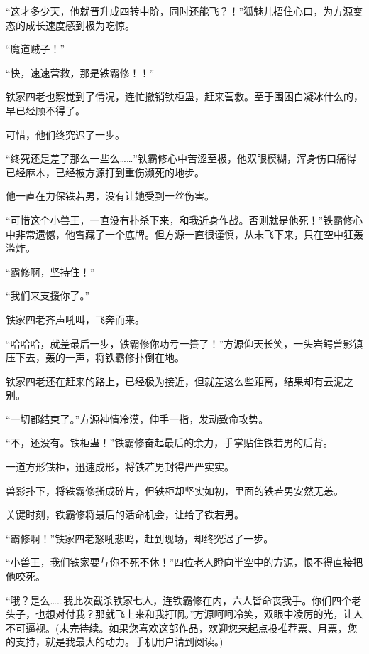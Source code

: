 \begin{this_body}
“这才多少天，他就晋升成四转中阶，同时还能飞？！”狐魅儿捂住心口，为方源变态的成长速度感到极为吃惊。

“魔道贼子！”

“快，速速营救，那是铁霸修！！”

铁家四老也察觉到了情况，连忙撤销铁柜蛊，赶来营救。至于围困白凝冰什么的，早已经顾不得了。

可惜，他们终究迟了一步。

“终究还是差了那么一些么……”铁霸修心中苦涩至极，他双眼模糊，浑身伤口痛得已经麻木，已经被方源打到重伤濒死的地步。

他一直在力保铁若男，没有让她受到一丝伤害。

“可惜这个小兽王，一直没有扑杀下来，和我近身作战。否则就是他死！”铁霸修心中非常遗憾，他雪藏了一个底牌。但方源一直很谨慎，从未飞下来，只在空中狂轰滥炸。

“霸修啊，坚持住！”

“我们来支援你了。”

铁家四老齐声吼叫，飞奔而来。

“哈哈哈，就差最后一步，铁霸修你功亏一篑了！”方源仰天长笑，一头岩鳄兽影镇压下去，轰的一声，将铁霸修扑倒在地。

铁家四老还在赶来的路上，已经极为接近，但就差这么些距离，结果却有云泥之别。

“一切都结束了。”方源神情冷漠，伸手一指，发动致命攻势。

“不，还没有。铁柜蛊！”铁霸修奋起最后的余力，手掌贴住铁若男的后背。

一道方形铁柜，迅速成形，将铁若男封得严严实实。

兽影扑下，将铁霸修撕成碎片，但铁柜却坚实如初，里面的铁若男安然无恙。

关键时刻，铁霸修将最后的活命机会，让给了铁若男。

“霸修啊！”铁家四老怒吼悲鸣，赶到现场，却终究迟了一步。

“小兽王，我们铁家要与你不死不休！”四位老人瞪向半空中的方源，恨不得直接把他咬死。

“哦？是么……我此次截杀铁家七人，连铁霸修在内，六人皆命丧我手。你们四个老头子，也想对付我？那就飞上来和我打啊。”方源呵呵冷笑，双眼中凌厉的光，让人不可逼视。(未完待续。如果您喜欢这部作品，欢迎您来起点投推荐票、月票，您的支持，就是我最大的动力。手机用户请到阅读。)

\end{this_body}

